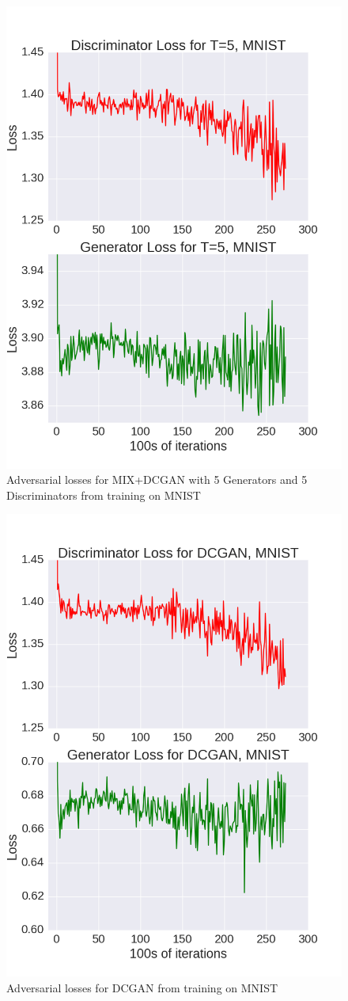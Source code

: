 \documentclass{article}
\begin{document}
\begin{figure}[!htb]%
  \centering
  \includegraphics[width=.85\linewidth]{figures/Loss_Graph_MNIST_T=5.png}
  \caption{Adversarial losses for MIX+DCGAN with 5 Generators and 5 Discriminators from training on MNIST}
  \label{fig5}
\end{figure}

\begin{figure}[!htb]%
  \centering
  \includegraphics[width=.85\linewidth]{figures/Loss_Graph_MNIST_T=1.png}
  \caption{Adversarial losses for DCGAN from training on MNIST}
  \label{fig6}
\end{figure}
\end{document}
